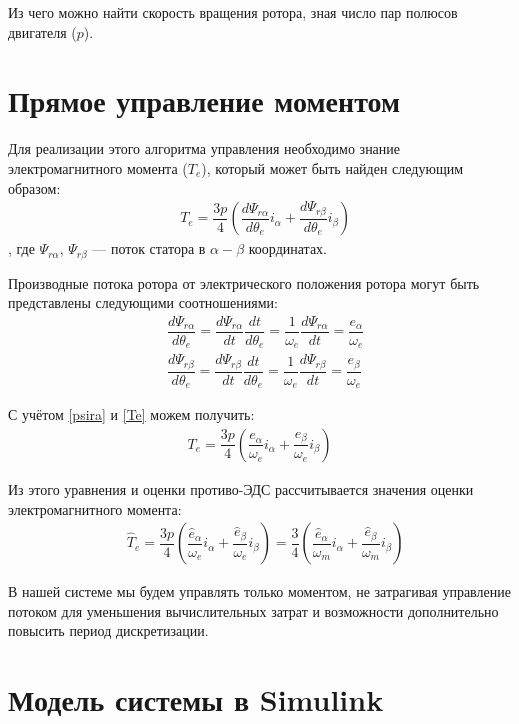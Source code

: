 Из чего можно найти скорость вращения ротора, зная число пар полюсов двигателя ($p$).

\section{Прямое управление моментом}

Для реализации этого алгоритма управления необходимо знание электромагнитного момента ($T_e$), который может быть найден следующим образом\cite{art:dtc_smo}:  
\begin{align}
	\label{Te}
	&T_e=\dfrac{3p}{4}\left(\dfrac{d\Psi_{r\alpha}}{d\theta_e}i_{\alpha}+\dfrac{d\Psi_{r\beta}}{d\theta_e}i_{\beta}\right)
\end{align}, где $\Psi_{r\alpha}$, $\Psi_{r\beta}$ --- поток статора в $\alpha-\beta$ координатах.

Производные потока ротора от электрического положения ротора могут быть представлены следующими соотношениями:
\begin{align}
	\label{psira}
	&\dfrac{d\Psi_{r\alpha}}{d\theta_e}=\dfrac{d\Psi_{r\alpha}}{dt}\dfrac{dt}{d\theta_e}=\dfrac{1}{\omega_e}\dfrac{d\Psi_{r\alpha}}{dt}=\dfrac{e_\alpha}{\omega_e}\\
	&\dfrac{d\Psi_{r\beta}}{d\theta_e}=\dfrac{d\Psi_{r\beta}}{dt}\dfrac{dt}{d\theta_e}=\dfrac{1}{\omega_e}\dfrac{d\Psi_{r\beta}}{dt}=\dfrac{e_\beta}{\omega_e}
\end{align}

С учётом \ref{psira} и \ref{Te} можем получить:
\begin{align*}
	T_e=\dfrac{3p}{4}\left(\dfrac{e_{\alpha}}{\omega_e}i_{\alpha}+\dfrac{e_{\beta}}{\omega_e}i_{\beta}\right)
\end{align*}

Из этого уравнения и оценки противо-ЭДС рассчитывается значения оценки электромагнитного момента:
\begin{align}
\label{eq:T_e}
	&\hat{T}_e=\dfrac{3p}{4}\left(\dfrac{\hat{e}_{\alpha}}{\omega_e}i_{\alpha}+\dfrac{\hat{e}_{\beta}}{\omega_e}i_{\beta}\right)=\dfrac{3}{4}\left(\dfrac{\hat{e}_{\alpha}}{\omega_m}i_{\alpha}+\dfrac{\hat{e}_{\beta}}{\omega_m}i_{\beta}\right)
\end{align}

В нашей системе мы будем управлять только моментом, не затрагивая управление потоком для уменьшения вычислительных затрат и возможности дополнительно повысить период дискретизации.

\section{Модель системы в Simulink}

